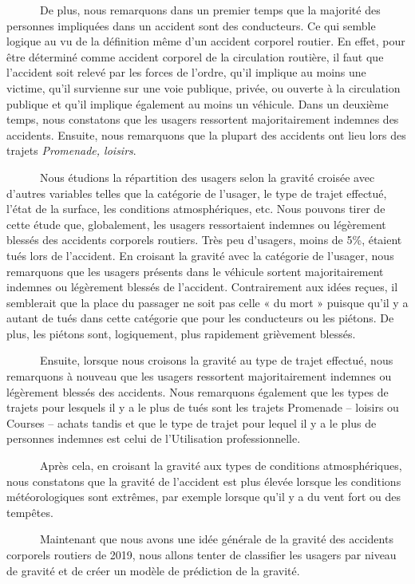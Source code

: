 \documentclass[french,]{tp}
\begin{document}
~~~~~~De plus, nous remarquons dans un premier temps que la majorité des personnes impliquées dans un accident sont des conducteurs. Ce qui semble logique au vu de la définition même d'un accident corporel routier. En effet, pour être déterminé comme accident corporel de la circulation routière, il faut que l'accident soit relevé par les forces de l'ordre, qu'il implique au moins une victime, qu'il survienne sur une voie publique, privée, ou ouverte à la circulation publique et qu'il implique également au moins un véhicule. Dans un deuxième temps, nous constatons que les usagers ressortent majoritairement indemnes des accidents. Ensuite, nous remarquons que la plupart des accidents ont lieu lors des trajets \emph{Promenade, loisirs}.

~~~~~~Nous étudions la répartition des usagers selon la gravité croisée avec d'autres variables telles que la catégorie de l'usager, le type de trajet effectué, l'état de la surface, les conditions atmosphériques, etc. Nous pouvons tirer de cette étude que, globalement, les usagers ressortaient indemnes ou légèrement blessés des accidents corporels routiers. Très peu d'usagers, moins de 5\%, étaient tués lors de l'accident. En croisant la gravité avec la catégorie de l'usager, nous remarquons que les usagers présents dans le véhicule sortent majoritairement indemnes ou légèrement blessés de l'accident. Contrairement aux idées reçues, il semblerait que la place du passager ne soit pas celle « du mort » puisque qu'il y a autant de tués dans cette catégorie que pour les conducteurs ou les piétons. De plus, les piétons sont, logiquement, plus rapidement grièvement blessés.

~~~~~~Ensuite, lorsque nous croisons la gravité au type de trajet effectué, nous remarquons à nouveau que les usagers ressortent majoritairement indemnes ou légèrement blessés des accidents. Nous remarquons également que les types de trajets pour lesquels il y a le plus de tués sont les trajets Promenade -- loisirs ou Courses -- achats tandis et que le type de trajet pour lequel il y a le plus de personnes indemnes est celui de l'Utilisation professionnelle.

~~~~~~Après cela, en croisant la gravité aux types de conditions atmosphériques, nous constatons que la gravité de l'accident est plus élevée lorsque les conditions météorologiques sont extrêmes, par exemple lorsque qu'il y a du vent fort ou des tempêtes.

~~~~~~Maintenant que nous avons une idée générale de la gravité des accidents corporels routiers de 2019, nous allons tenter de classifier les usagers par niveau de gravité et de créer un modèle de prédiction de la gravité.
\end{document}
